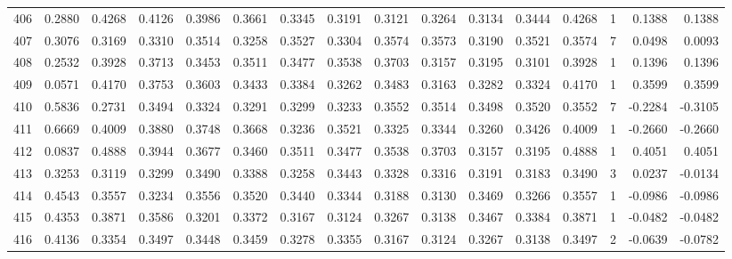 \begin{tabular}{lrrrrrrrrrrrrrrr}
406 &      0.2880 &  0.4268 &  0.4126 &  0.3986 &  0.3661 &  0.3345 &  0.3191 &  0.3121 &  0.3264 &  0.3134 &   0.3444 &     0.4268 &      1 &                    0.1388 &                     0.1388 \\
407 &      0.3076 &  0.3169 &  0.3310 &  0.3514 &  0.3258 &  0.3527 &  0.3304 &  0.3574 &  0.3573 &  0.3190 &   0.3521 &     0.3574 &      7 &                    0.0498 &                     0.0093 \\
408 &      0.2532 &  0.3928 &  0.3713 &  0.3453 &  0.3511 &  0.3477 &  0.3538 &  0.3703 &  0.3157 &  0.3195 &   0.3101 &     0.3928 &      1 &                    0.1396 &                     0.1396 \\
409 &      0.0571 &  0.4170 &  0.3753 &  0.3603 &  0.3433 &  0.3384 &  0.3262 &  0.3483 &  0.3163 &  0.3282 &   0.3324 &     0.4170 &      1 &                    0.3599 &                     0.3599 \\
410 &      0.5836 &  0.2731 &  0.3494 &  0.3324 &  0.3291 &  0.3299 &  0.3233 &  0.3552 &  0.3514 &  0.3498 &   0.3520 &     0.3552 &      7 &                   -0.2284 &                    -0.3105 \\
411 &      0.6669 &  0.4009 &  0.3880 &  0.3748 &  0.3668 &  0.3236 &  0.3521 &  0.3325 &  0.3344 &  0.3260 &   0.3426 &     0.4009 &      1 &                   -0.2660 &                    -0.2660 \\
412 &      0.0837 &  0.4888 &  0.3944 &  0.3677 &  0.3460 &  0.3511 &  0.3477 &  0.3538 &  0.3703 &  0.3157 &   0.3195 &     0.4888 &      1 &                    0.4051 &                     0.4051 \\
413 &      0.3253 &  0.3119 &  0.3299 &  0.3490 &  0.3388 &  0.3258 &  0.3443 &  0.3328 &  0.3316 &  0.3191 &   0.3183 &     0.3490 &      3 &                    0.0237 &                    -0.0134 \\
414 &      0.4543 &  0.3557 &  0.3234 &  0.3556 &  0.3520 &  0.3440 &  0.3344 &  0.3188 &  0.3130 &  0.3469 &   0.3266 &     0.3557 &      1 &                   -0.0986 &                    -0.0986 \\
415 &      0.4353 &  0.3871 &  0.3586 &  0.3201 &  0.3372 &  0.3167 &  0.3124 &  0.3267 &  0.3138 &  0.3467 &   0.3384 &     0.3871 &      1 &                   -0.0482 &                    -0.0482 \\
416 &      0.4136 &  0.3354 &  0.3497 &  0.3448 &  0.3459 &  0.3278 &  0.3355 &  0.3167 &  0.3124 &  0.3267 &   0.3138 &     0.3497 &      2 &                   -0.0639 &                    -0.0782 \\

\end{tabular}
